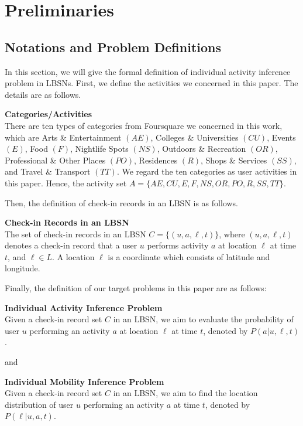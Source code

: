 \chapter{Preliminaries}
\label{sec:3}


\section{Notations and Problem Definitions}
In this section, we will give the formal definition of individual activity inference problem in LBSNs. First, we define the activities we concerned in this paper. The details are as follows.

\begin{definition}{\bf{Categories/Activities}}
\label{def:activity}
\\
There are ten types of categories from Foursquare we concerned in this work, which are Arts \& Entertainment $(AE)$, Colleges \& Universities $(CU)$, Events $(E)$, Food $(F)$, Nightlife Spots $(NS)$, Outdoors \& Recreation $(OR)$, Professional \& Other Places $(PO)$, Residences $(R)$, Shops \& Services $(SS)$, and Travel \& Transport $(TT)$. We regard the ten categories as user activities in this paper. Hence, the activity set $A= \{AE,CU,E,F,NS,OR,PO,R,SS,TT\}$.
\end{definition}

Then, the definition of check-in records in an LBSN is as follows.

\begin{definition}{\bf{Check-in Records in an LBSN}}
\label{def:checkin}
\\
The set of check-in records in an LBSN $C = \{(u, a, \ell, t)\}$, where $(u, a, \ell, t)$ denotes a check-in record that a user $u$ performs activity $a$ at location $\ell$ at time $t$, and $\ell \in L$. A location $\ell$ is a coordinate which consists of latitude and longitude.
\end{definition}


Finally, the definition of our target problems in this paper are as follows:

\begin{definition}{\bf{Individual Activity Inference Problem}}
\label{def:problem1}
\\
Given a check-in record set $C$ in an LBSN, we aim to evaluate the probability of user $u$ performing an activity $a$ at location $\ell$ at time $t$, denoted by $P(a|u, \ell, t)$.
\end{definition}
and
\begin{definition}{\bf{Individual Mobility Inference Problem}}
\label{def:problem1}
\\
Given a check-in record set $C$ in an LBSN, we aim to find the location distribution of user $u$ performing an activity $a$ at time $t$, denoted by $P(\ell | u, a, t)$.
\end{definition}



